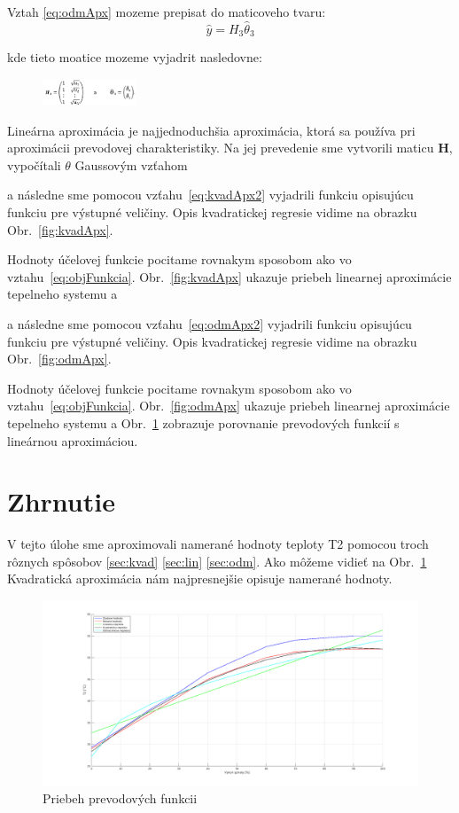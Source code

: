\documentclass{article}
\begin{document}
Vztah \ref{eq:odmApx} mozeme prepisat do maticoveho tvaru:
\begin{equation}
	\hat{y} = H_3\hat{\theta}_3
	\label{eq:odmApx2}

\end{equation}

kde tieto moatice mozeme vyjadrit nasledovne:

\begin{figure}[!htbp]
	\begin{center}
		\includegraphics[width=0.25\textwidth]{include/defHandTheta3.png}
	\end{center}
\end{figure}

Lineárna aproximácia je najjednoduchšia aproximácia, ktorá sa používa pri aproximácii prevodovej
charakteristiky. Na jej prevedenie sme vytvorili maticu \textbf{H}, vypočítali
\(\theta\) Gaussovým vzťahom

a následne sme pomocou vzťahu~\ref{eq:kvadApx2} vyjadrili funkciu opisujúcu funkciu pre výstupné
veličiny. Opis kvadratickej regresie vidime na obrazku Obr.~\ref{fig:kvadApx}.

Hodnoty účelovej funkcie pocitame rovnakym sposobom ako vo vztahu~\ref{eq:objFunkcia}.
Obr.~\ref{fig:kvadApx} ukazuje priebeh linearnej aproximácie tepelneho systemu a

a následne sme pomocou vzťahu~\ref{eq:odmApx2} vyjadrili funkciu opisujúcu funkciu pre výstupné
veličiny. Opis kvadratickej regresie vidime na obrazku Obr.~\ref{fig:odmApx}.

Hodnoty účelovej funkcie pocitame rovnakym sposobom ako vo vztahu~\ref{eq:objFunkcia}.
Obr.~\ref{fig:odmApx} ukazuje priebeh linearnej aproximácie tepelneho systemu a
Obr.~\ref{fig:prevod} zobrazuje porovnanie prevodových funkcií s lineárnou aproximáciou.
\clearpage

\section{Zhrnutie}
\label{sec:zhrnutie}

V tejto úlohe sme aproximovali namerané hodnoty teploty T2 pomocou troch rôznych spôsobov \ref{sec:kvad} \ref{sec:lin} \ref{sec:odm}.
Ako môžeme vidieť na Obr.~\ref{fig:prevod} Kvadratická aproximácia nám najpresnejšie opisuje namerané hodnoty.

\begin{figure}[!htbp]
	\begin{center}
		\includegraphics[width=\textwidth]{./include/prevodove_funkcie2.png}
		\caption{Priebeh prevodových funkcii}
		\label{fig:prevod}
	\end{center}
	\hfill
\end{figure}
\end{document}
